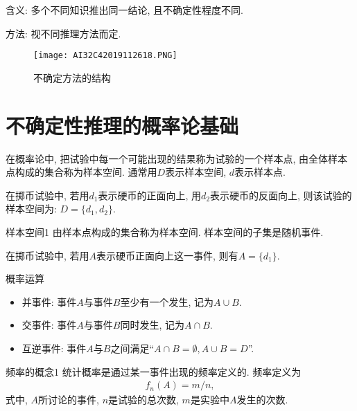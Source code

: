    含义: 多个不同知识推出同一结论, 且不确定性程度不同.

    方法: 视不同推理方法而定.
\begin{figure}[H]
    \centering
    \texttt{[image: AI32C42019112618.PNG]}
    \caption{不确定方法的结构}
    \label{AI32fig2618}
\end{figure}
\section{不确定性推理的概率论基础}\label{AI32C6Sec6.3}
在概率论中, 把试验中每一个可能出现的结果称为试验的一个样本点, 由全体样本点构成的集合称为样本空间.
通常用$D$表示样本空间, $d$表示样本点.

\begin{example}
  在掷币试验中, 若用$d_1$表示硬币的正面向上, 用$d_2$表示硬币的反面向上, 则该试验的样本空间为: $D=\{d_1, d_2\}$.
\end{example}

\begin{mydef}{样本空间}{1}
    由样本点构成的集合称为样本空间. 样本空间的子集是随机事件.
\end{mydef}

\begin{example}
  在掷币试验中, 若用$A$表示硬币正面向上这一事件, 则有$A=\{d_1\}$.
\end{example}

概率运算
\begin{itemize}
\item 并事件: 事件$A$与事件$B$至少有一个发生, 记为$A\cup B$.

\item 交事件: 事件$A$与事件$B$同时发生, 记为$A\cap B$.

\item 互逆事件: 事件$A$与$B$之间满足“$A\cap B=\emptyset,  A\cup B=D$”.
\end{itemize}

\begin{mydef}{频率的概念}{1}
统计概率是通过某一事件出现的频率定义的. 频率定义为
\begin{align}
    f_n(A)=m/n,
\end{align}
式中, $A$所讨论的事件, $n$是试验的总次数, $m$是实验中$A$发生的次数.
\end{mydef}

